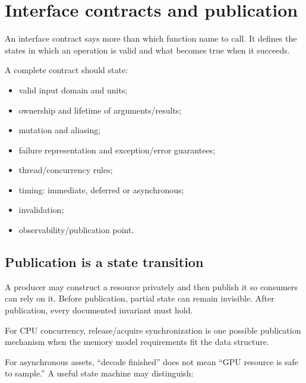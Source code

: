 \hypertarget{appendix-fdae7ff0a23f}{}\label{referencestart:appendix-fdae7ff0a23f}
\section{Interface contracts and publication}\label{appendix-fdae7ff0a23f-interface-contracts-and-publication}

\hypertarget{appendix-fdae7ff0a23f-interface-contracts-and-publication}{}

An interface contract says more than which function name to call. It defines the states in which an operation is valid and what becomes true when it succeeds.

A complete contract should state:

\begin{itemize}
\tightlist
\item
  valid input domain and units;
\item
  ownership and lifetime of arguments/results;
\item
  mutation and aliasing;
\item
  failure representation and exception/error guarantees;
\item
  thread/concurrency rules;
\item
  timing: immediate, deferred or asynchronous;
\item
  invalidation;
\item
  observability/publication point.
\end{itemize}

\subsection{Publication is a state transition}\label{appendix-fdae7ff0a23f-publication-is-a-state-transition}

\hypertarget{appendix-fdae7ff0a23f-publication-is-a-state-transition}{}

A producer may construct a resource privately and then publish it so consumers can rely on it. Before publication, partial state can remain invisible. After publication, every documented invariant must hold.

For CPU concurrency, release/acquire synchronization is one possible publication mechanism when the memory model requirements fit the data structure.

For asynchronous assets, ``decode finished'' does not mean ``GPU resource is safe to sample.'' A useful state machine may distinguish:

